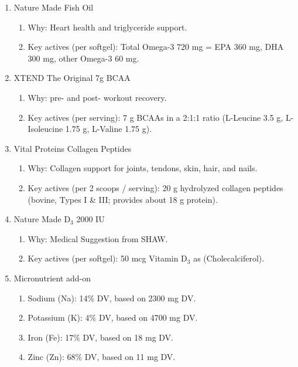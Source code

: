 \begin{enumerate}
    \item Nature Made Fish Oil
    \begin{enumerate}
        \item Why: Heart health and triglyceride support.
        \item Key actives (per softgel): Total Omega-3 720 mg = EPA 360 mg, DHA 300 mg, other Omega-3 60 mg.
    \end{enumerate}
    
    \item XTEND The Original 7g BCAA 
    \begin{enumerate}
        \item Why: pre- and post- workout recovery.
        \item Key actives (per serving): 7 g BCAAs in a 2:1:1 ratio (L-Leucine 3.5 g, L-Isoleucine 1.75 g, L-Valine 1.75 g).
    \end{enumerate}
    
    \item Vital Proteins Collagen Peptides
    \begin{enumerate}
        \item Why: Collagen support for joints, tendons, skin, hair, and nails.
        \item Key actives (per 2 scoops / serving): 20 g hydrolyzed collagen peptides (bovine, Types I \& III; provides about 18 g protein).
    \end{enumerate}

    \item Nature Made D$_3$ 2000 IU
    \begin{enumerate}
        \item Why: Medical Suggestion from SHAW.
        \item Key actives (per softgel): 50 mcg Vitamin D$_3$ as (Cholecalciferol).
    \end{enumerate}

    \item Micronutrient add-on 
    \begin{enumerate}
        \item Sodium (Na): 14\% DV, based on 2300 mg DV.
        \item Potassium (K): 4\% DV, based on 4700 mg DV.
        \item Iron (Fe): 17\% DV, based on 18 mg DV. 
        \item Zinc (Zn): 68\% DV, based on 11 mg DV.
    \end{enumerate} 
\end{enumerate}
